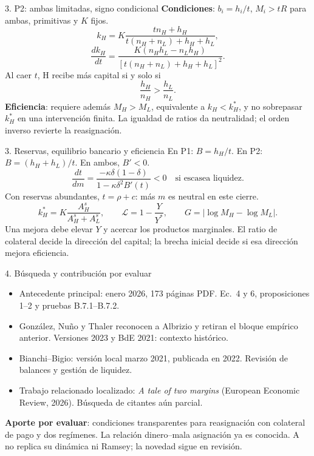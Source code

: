 \documentclass[aspectratio=169,11pt]{beamer}
\begin{document}
\begin{frame}{3. P2: ambas limitadas, signo condicional}
\textbf{Condiciones}: $b_i=h_i/t$, $M_i>tR$ para ambas,
primitivas y $K$ fijos.
\[
 k_H=K\frac{tn_H+h_H}{t(n_H+n_L)+h_H+h_L},
\]
\[
 \frac{dk_H}{dt}=\frac{K(n_Hh_L-n_Lh_H)}{[t(n_H+n_L)+h_H+h_L]^2}.
\]
Al caer $t$, H recibe m\'as capital si y solo si
\[
 \frac{h_H}{n_H}>\frac{h_L}{n_L}.
\]
\textbf{Eficiencia}: requiere adem\'as $M_H>M_L$, equivalente a $k_H<k_H^*$,
y no sobrepasar $k_H^*$ en una intervenci\'on finita.
La igualdad de ratios da neutralidad; el orden inverso revierte la reasignaci\'on.
\end{frame}

\begin{frame}{3. Reservas, equilibrio bancario y eficiencia}
En P1: $B=h_H/t$. En P2: $B=(h_H+h_L)/t$. En ambos, $B'<0$.
\[
 \frac{dt}{dm}=\frac{-\kappa\delta(1-\delta)}{1-\kappa\delta^2B'(t)}<0
 \quad\text{si escasea liquidez}.
\]
Con reservas abundantes, $t=\rho+c$: m\'as $m$ es neutral en este cierre.
\[
 k_H^*=K\frac{A_H^s}{A_H^s+A_L^s},\qquad
 \mathcal L=1-\frac{Y}{Y^*},\qquad G=|\log M_H-\log M_L|.
\]
Una mejora debe elevar $Y$ y acercar los productos marginales.
El ratio de colateral decide la direcci\'on del capital; la brecha inicial
decide si esa direcci\'on mejora eficiencia.
\end{frame}

\begin{frame}{4. B\'usqueda y contribuci\'on por evaluar}
\begin{itemize}
 \item Antecedente principal: enero 2026, 173 p\'aginas PDF. Ec.~4 y 6,
 proposiciones 1--2 y pruebas B.7.1--B.7.2.
 \item Gonz\'alez, Nu\~no y Thaler reconocen a Albrizio y retiran el bloque
 emp\'irico anterior. Versiones 2023 y BdE 2021: contexto hist\'orico.
 \item Bianchi--Bigio: versi\'on local marzo 2021, publicada en 2022.
 Revisi\'on de balances y gesti\'on de liquidez.
 \item Trabajo relacionado localizado: \emph{A tale of two margins}
 (European Economic Review, 2026). B\'usqueda de citantes a\'un parcial.
\end{itemize}
\medskip
\textbf{Aporte por evaluar}: condiciones transparentes para reasignaci\'on
con colateral de pago y dos reg\'imenes. La relaci\'on dinero--mala asignaci\'on
ya es conocida. A no replica su din\'amica ni Ramsey; la novedad sigue en revisi\'on.
\end{frame}
\end{document}
